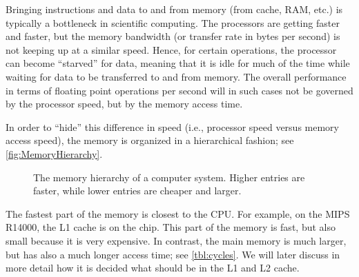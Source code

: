 Bringing instructions and data to and from memory (from cache, RAM, etc.) is
typically a bottleneck in scientific computing. The processors are getting
faster and faster, but the memory bandwidth (or transfer rate in bytes per
second) is not keeping up at a similar speed. Hence, for certain operations, the
processor can become ``starved'' for data, meaning that it is idle for much of
the time while waiting for data to be transferred to and from memory. The
overall performance in terms of floating point operations per second will in
such cases not be governed by the processor speed, but by the memory access
time.

In order to ``hide'' this difference in speed (i.e., processor speed versus
memory access speed), the memory is organized in a hierarchical fashion;
see \autoref{fig:MemoryHierarchy}.
\begin{figure}
  \centering
  \caption{
    The memory hierarchy of a computer system. Higher entries are faster, while
    lower entries are cheaper and larger.
  }
  \label{fig:MemoryHierarchy}
\end{figure}
The fastest part of the memory is closest to the CPU. For example, on the MIPS
R14000, the L1 cache is on the chip. This part of the memory is fast, but also
small because it is very expensive. In contrast, the main memory is much larger,
but has also a much longer access time; see \autoref{tbl:cycles}. We will later
discuss in more detail how it is decided what should be in the L1 and L2 cache.

